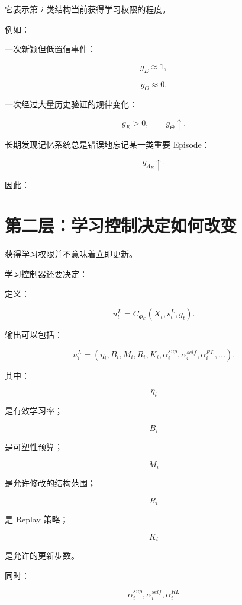 它表示第 \(i\) 类结构当前获得学习权限的程度。

例如：

一次新颖但低置信事件：

\[
g_E\approx1,
\]

\[
g_\Theta\approx0.
\]

一次经过大量历史验证的规律变化：

\[
g_E>0,
\qquad
g_\Theta\uparrow.
\]

长期发现记忆系统总是错误地忘记某一类重要 Episode：

\[
g_{\Lambda_E}\uparrow.
\]

因此：

\begin{statementbox}
\centering
{}
\end{statementbox}


\section{第二层：学习控制决定如何改变}

获得学习权限并不意味着立即更新。

学习控制器还要决定：

\begin{statementbox}
\centering
{}
\end{statementbox}

定义：

\[
\boxed{
u_t^L
=
C_{\Phi_C}
(
X_t,
s_t^L,
g_t
).
}
\]

输出可以包括：

\[
u_i^L
=
(
\eta_i,
B_i,
M_i,
R_i,
K_i,
\alpha_i^{sup},
\alpha_i^{self},
\alpha_i^{RL},
\ldots
).
\]

其中：

\[
\eta_i
\]

是有效学习率；

\[
B_i
\]

是可塑性预算；

\[
M_i
\]

是允许修改的结构范围；

\[
R_i
\]

是 Replay 策略；

\[
K_i
\]

是允许的更新步数。

同时：

\[
\alpha_i^{sup},
\alpha_i^{self},
\alpha_i^{RL}
\]

